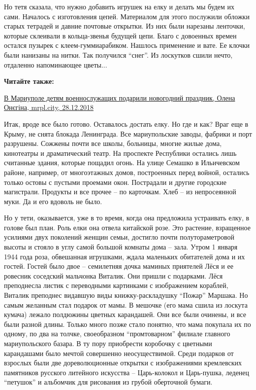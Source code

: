 Но тетя сказала, что нужно добавить игрушек на елку и делать мы будем их сами.
Началось с изготовления цепей. Материалом для этого послужили обложки старых
тетрадей и давние почтовые открытки. Из них были нарезаны ленточки, которые
склеивали в кольца-звенья будущей цепи. Благо с довоенных времен остался
пузырек с клеем-гуммиарабиком. Нашлось применение и вате. Ее клочки были
нанизаны на нитки. Так получился \enquote{снег}. Из лоскутков сшили нечто, отдаленно
напоминающее цветы...

\textbf{Читайте также:} 

\href{https://mrpl.city/news/view/v-mariupole-detyam-voennosluzhashhih-podarili-novogodnij-prazdnik-foto}{%
В Мариуполе детям военнослужащих подарили новогодний праздник, Олена Онєгіна, mrpl.city, 28.12.2018}

Итак, вроде все было готово. Оставалось достать елку. Но где и как? Враг еще в
Крыму, не снята блокада Ленинграда. Все мариупольские заводы, фабрики и порт
разрушены. Сожжены почти все школы, больницы, многие жилые дома, кинотеатры и
драматический театр. На проспекте Республики остались лишь считанные здания,
которые пощадил огонь. На улице Семашко в Ильичевском районе, например, от
многоэтажных домов, построенных перед войной, остались только остовы с пустыми
проемами окон. Пострадали и другие городские магистрали. Продукты и все прочее
– по карточкам. Хлеб – из непросеянной муки. Да и его вдоволь не было.

Но у тети, оказывается, уже в то время, когда она предложила устраивать елку, в
голове был план. Роль елки она отвела китайской розе. Это растение, взращенное
усилиями двух поколений женщин семьи, достигло почти полутораметровой высоты и
стояло в углу самой большой комнаты дома – зала. Утром 1 января 1944 года роза,
обвешанная игрушками, ждала маленьких обитателей дома и их гостей. Гостей было
двое – семилетняя дочка маминых приятелей Лёся и ее ровесник соседский
мальчонка Виталик. Они пришли с подарками. Лёся преподнесла листик с
переводными картинками с изображением кораблей, Виталик преподнес видавшую виды
книжку-раскладушку \enquote{Пожар} Маршака. Но самым желанным стал подарок от мамы. В
мешочке (его мама сшила из лоскута кумача) лежало полдюжины цветных карандашей.
Они все были очинены, и все были разной длины. Только много позже стало
понятно, что мама покупала их по одному, по два на толчке, своеобразном
\enquote{промтоварном} филиале главного мариупольского базара. В ту пору приобрести
коробочку с цветными карандашами было мечтой совершенно неосуществимой. Среди
подарков от взрослых были две дореволюционные открытки с изображениями
кремлевских памятников русского литейного искусства – Царь-колокол и
Царь-пушка, леденец \enquote{петушок} и альбомчик для рисования из грубой оберточной
бумаги.

